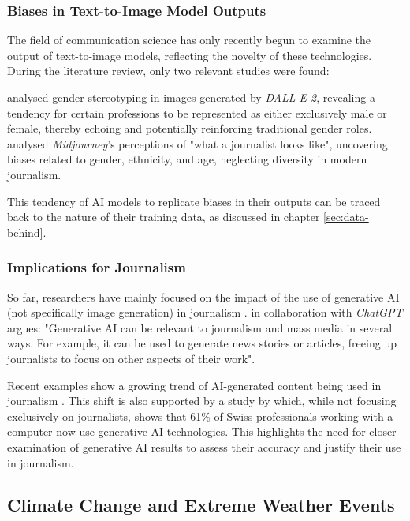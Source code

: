 \label{sec:data-behind}

\subsubsection{Biases in Text-to-Image Model Outputs}
The field of communication science has only recently begun to examine the output of text-to-image models, reflecting the novelty of these technologies. During the literature review, only two relevant studies were found:

\textcite{Garcia2023} analysed gender stereotyping in images generated by \textit{DALL-E 2}, revealing a tendency for certain professions to be represented as either exclusively male or female, thereby echoing and potentially reinforcing traditional gender roles. \textcite{Thomas2023} analysed \textit{Midjourney}'s perceptions of "what a journalist looks like", uncovering biases related to gender, ethnicity, and age, neglecting diversity in modern journalism.

This tendency of AI models to replicate biases in their outputs can be traced back to the nature of their training data, as discussed in chapter \ref{sec:data-behind}. 

\subsubsection{Implications for Journalism}

So far, researchers have mainly focused on the impact of the use of generative AI (not specifically image generation) in journalism \parencite{Broussard2019}. \textcite[87]{Pavlik2023} in collaboration with \textit{ChatGPT} argues: "Generative AI can be relevant to journalism and mass media in several ways. For example, it can be used to generate news stories or articles, freeing up journalists to focus on other aspects of their work".

Recent examples show a growing trend of AI-generated content being used in journalism \parencite{Henrich2023, Kim2023}. This shift is also supported by a study by \textcite{Deloitte2023} which, while not focusing exclusively on journalists, shows that 61\% of Swiss professionals working with a computer now use generative AI technologies. This  highlights the need for closer examination of generative AI results to assess their accuracy and justify their use in journalism.

\subsection{Climate Change and Extreme Weather Events}
\label{subsec:climate-change-and-extreme-weather}

